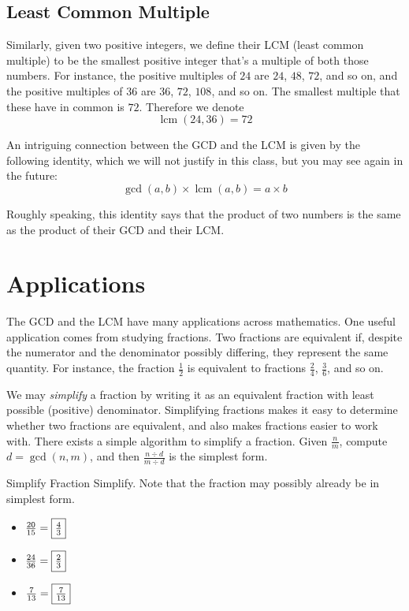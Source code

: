 \documentclass[a4paper,10pt]{report}
\begin{document}
\subsection{Least Common Multiple}
Similarly, given two positive integers, we define their LCM (least common
multiple) to be the smallest positive integer that's a multiple of both those
numbers. For instance, the positive multiples of $24$ are $24$, $48$, $72$, and
so on, and the positive multiples of $36$ are $36$, $72$, $108$, and so on.
The smallest multiple that these have in common is $72$. Therefore we
denote \[
 \operatorname{lcm}(24, 36) = 72
\]

An intriguing connection between the GCD and the LCM is given by the following
identity, which we will not justify in this class, but you may see again in the
future: \[
 \gcd(a, b) \times \operatorname{lcm}(a, b) = a \times b
\]

Roughly speaking, this identity says that the product of two numbers is the same
as the product of their GCD and their LCM.

\section{Applications}
The GCD and the LCM have many applications across mathematics. One useful
application comes from studying fractions. Two fractions are equivalent if,
despite the numerator and the denominator possibly differing, they represent
the same quantity. For instance, the fraction $\frac{1}{2}$ is equivalent to
fractions $\frac{2}{4}$, $\frac{3}{6}$, and so on.

We may \emph{simplify} a fraction by writing it as an equivalent fraction with
least possible (positive) denominator. Simplifying fractions makes it easy to
determine whether two fractions are equivalent, and also makes fractions easier
to work with. There exists a simple algorithm to simplify a fraction. Given
$\frac{n}{m}$, compute $d=\gcd(n, m)$, and then $\frac{n\div d}{m\div d}$ is the
simplest form.

\begin{problem}{Simplify Fraction}
 Simplify. Note that the fraction may possibly already be in simplest form.

 \begin{itemize}
  \item $\frac{20}{15}=\Ans{\frac{4}{3}}$
  \item $\frac{24}{36}=\Ans{\frac{2}{3}}$
  \item $\frac{7}{13}=\Ans{\frac{7}{13}}$
 \end{itemize}
\end{problem}
\end{document}
